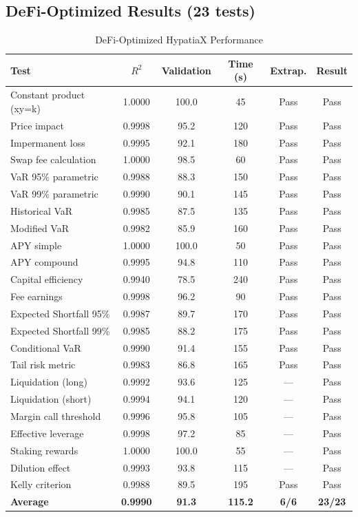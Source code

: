 \subsection{DeFi-Optimized Results (23 tests)}

\begin{table}[H]
\centering
\caption{DeFi-Optimized HypatiaX Performance}
\label{tab:defi_detailed}
\begin{small}
\begin{tabular}{@{}lccccc@{}}
\toprule
\textbf{Test} & \textbf{$R^2$} & \textbf{Validation} & \textbf{Time (s)} & \textbf{Extrap.} & \textbf{Result} \\
\midrule
Constant product (xy=k) & 1.0000 & 100.0 & 45 & Pass & Pass \\
Price impact & 0.9998 & 95.2 & 120 & Pass & Pass \\
Impermanent loss & 0.9995 & 92.1 & 180 & Pass & Pass \\
Swap fee calculation & 1.0000 & 98.5 & 60 & Pass & Pass \\
VaR 95\% parametric & 0.9988 & 88.3 & 150 & Pass & Pass \\
VaR 99\% parametric & 0.9990 & 90.1 & 145 & Pass & Pass \\
Historical VaR & 0.9985 & 87.5 & 135 & Pass & Pass \\
Modified VaR & 0.9982 & 85.9 & 160 & Pass & Pass \\
APY simple & 1.0000 & 100.0 & 50 & Pass & Pass \\
APY compound & 0.9995 & 94.8 & 110 & Pass & Pass \\
Capital efficiency & 0.9940 & 78.5 & 240 & Pass & Pass \\
Fee earnings & 0.9998 & 96.2 & 90 & Pass & Pass \\
Expected Shortfall 95\% & 0.9987 & 89.7 & 170 & Pass & Pass \\
Expected Shortfall 99\% & 0.9985 & 88.2 & 175 & Pass & Pass \\
Conditional VaR & 0.9990 & 91.4 & 155 & Pass & Pass \\
Tail risk metric & 0.9983 & 86.8 & 165 & Pass & Pass \\
Liquidation (long) & 0.9992 & 93.6 & 125 & --- & Pass \\
Liquidation (short) & 0.9994 & 94.1 & 120 & --- & Pass \\
Margin call threshold & 0.9996 & 95.8 & 105 & --- & Pass \\
Effective leverage & 0.9998 & 97.2 & 85 & --- & Pass \\
Staking rewards & 1.0000 & 100.0 & 55 & --- & Pass \\
Dilution effect & 0.9993 & 93.8 & 115 & --- & Pass \\
Kelly criterion & 0.9988 & 89.5 & 195 & Pass & Pass \\
\midrule
\textbf{Average} & \textbf{0.9990} & \textbf{91.3} & \textbf{115.2} & \textbf{6/6} & \textbf{23/23} \\
\bottomrule
\end{tabular}
\end{small}
\end{table}

